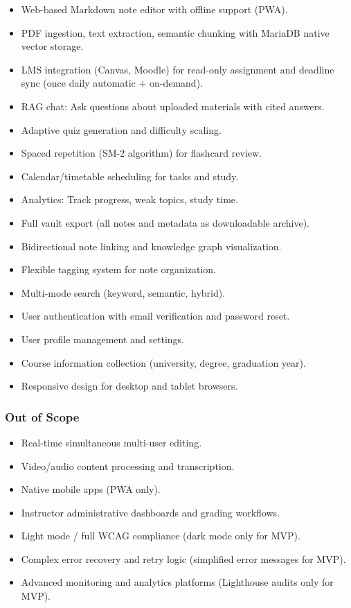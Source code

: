 \documentclass[12pt,a4paper]{article}
\begin{document}
\begin{itemize}
    \item Web-based Markdown note editor with offline support (PWA).
    \item PDF ingestion, text extraction, semantic chunking with MariaDB native vector storage.
    \item LMS integration (Canvas, Moodle) for read-only assignment and deadline sync (once daily automatic + on-demand).
    \item RAG chat: Ask questions about uploaded materials with cited answers.
    \item Adaptive quiz generation and difficulty scaling.
    \item Spaced repetition (SM-2 algorithm) for flashcard review.
    \item Calendar/timetable scheduling for tasks and study.
    \item Analytics: Track progress, weak topics, study time.
    \item Full vault export (all notes and metadata as downloadable archive).
    \item Bidirectional note linking and knowledge graph visualization.
    \item Flexible tagging system for note organization.
    \item Multi-mode search (keyword, semantic, hybrid).
    \item User authentication with email verification and password reset.
    \item User profile management and settings.
    \item Course information collection (university, degree, graduation year).
    \item Responsive design for desktop and tablet browsers.
\end{itemize}

\subsubsection{Out of Scope}

\begin{itemize}
    \item Real-time simultaneous multi-user editing.
    \item Video/audio content processing and transcription.
    \item Native mobile apps (PWA only).
    \item Instructor administrative dashboards and grading workflows.
    \item Light mode / full WCAG compliance (dark mode only for MVP).
    \item Complex error recovery and retry logic (simplified error messages for MVP).
    \item Advanced monitoring and analytics platforms (Lighthouse audits only for MVP).
\end{itemize}
\end{document}
